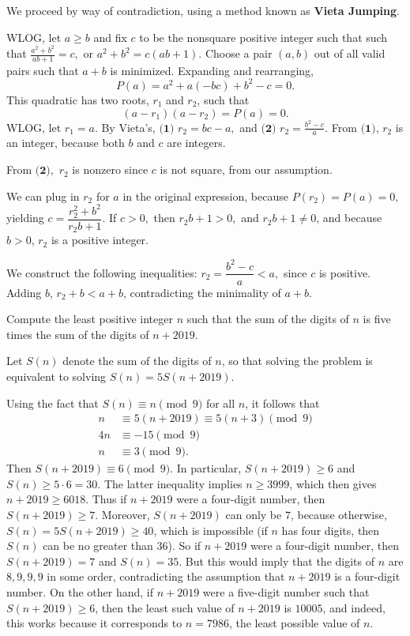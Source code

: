\begin{solution}
We proceed by way of contradiction, using a method known as \textbf{Vieta Jumping}.

WLOG, let $a\ge b$ and fix $c$ to be the nonsquare positive integer such that such that $\frac{a^2+b^2}{ab+1}=c,$ or $a^2+b^2=c(ab+1).$ Choose a pair $(a, b)$ out of all valid pairs such that $a+b$ is minimized. Expanding and rearranging,\[P(a)=a^2+a(-bc)+b^2-c=0.\]This quadratic has two roots, $r_1$ and $r_2$, such that\[(a-r_1)(a-r_2)=P(a)=0.\]WLOG, let $r_1=a$. By Vieta's, $\textbf{(1) } r_2=bc-a,$ and $\textbf{(2) } r_2=\frac{b^2-c}{a}.$ From $\textbf{(1)}$, $r_2$ is an integer, because both $b$ and $c$ are integers.

From $\textbf{(2)},$ $r_2$ is nonzero since $c$ is not square, from our assumption.

We can plug in $r_2$ for $a$ in the original expression, because $P(r_2)=P(a)=0,$ yielding $c=\dfrac{r^2_2+b^2}{r_2b+1}$. If $c>0,$ then $r_2b+1>0,$ and $r_2b+1\neq0$, and because $b>0$, $r_2$ is a positive integer.

We construct the following inequalities: $r_2=\dfrac{b^2-c}{a}<a,$ since $c$ is positive. Adding $b$, $r_2+b<a+b$, contradicting the minimality of $a+b$.
\end{solution}

\begin{prbm}
Compute the least positive integer $n$ such that the sum of the digits of $n$ is five times the sum of the digits of $n+2019$.
\end{prbm}

\begin{solution}
Let $S(n)$ denote the sum of the digits of $n$, so that solving the problem is equivalent to solving $S(n)=5S(n+2019)$.

Using the fact that $S(n)\equiv n\pmod 9$ for all $n$, it follows that
\begin{align*}
n&\equiv5(n+2019)\equiv5(n+3)\pmod 9\\
4n&\equiv-15\pmod 9\\
n&\equiv3\pmod 9.
\end{align*}
Then $S(n+2019)\equiv6\pmod 9$. In particular, $S(n+2019)\ge6$ and $S(n)\ge5\cdot6=30$. The latter inequality implies $n\ge3999$, which then gives $n+2019\ge6018$. Thus if $n+2019$ were a four-digit number, then $S(n+2019)\ge7$. Moreover, $S(n+2019)$ can only be $7$, because otherwise, $S(n)=5S(n+2019)\ge40$, which is impossible (if $n$ has four digits, then $S(n)$ can be no greater than $36$). So if $n+2019$ were a four-digit number, then $S(n+2019)=7$ and $S(n)=35$. But this would imply that the digits of $n$ are $8, 9, 9, 9$ in some order, contradicting the assumption that $n+2019$ is a four-digit number. On the other hand, if $n+2019$ were a five-digit number such that $S(n+2019)\ge6$, then the least such value of $n+2019$ is $10005$, and indeed, this works because it corresponds to $\boxed{n=7986}$, the least possible value of $n$.
\end{solution}

